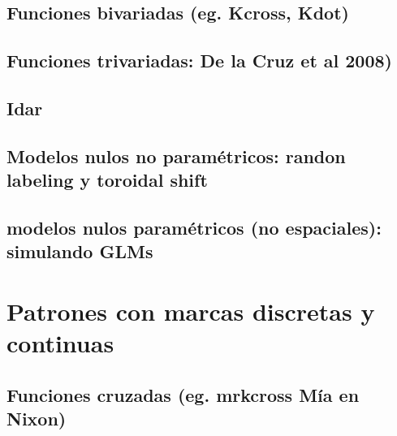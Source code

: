 \documentclass[
  letterpaper,
  DIV=11,
  numbers=noendperiod]{scrreprt}
\begin{document}
\hypertarget{funciones-bivariadas-eg.-kcross-kdot}{%
\section{Funciones bivariadas (eg. Kcross,
Kdot)}\label{funciones-bivariadas-eg.-kcross-kdot}}

\hypertarget{funciones-trivariadas-de-la-cruz-et-al-2008}{%
\section{Funciones trivariadas: De la Cruz et al
2008)}\label{funciones-trivariadas-de-la-cruz-et-al-2008}}

\hypertarget{idar}{%
\section{Idar}\label{idar}}

\hypertarget{modelos-nulos-no-paramuxe9tricos-randon-labeling-y-toroidal-shift-1}{%
\section{Modelos nulos no paramétricos: randon labeling y toroidal
shift}\label{modelos-nulos-no-paramuxe9tricos-randon-labeling-y-toroidal-shift-1}}

\hypertarget{modelos-nulos-paramuxe9tricos-no-espaciales-simulando-glms-1}{%
\section{modelos nulos paramétricos (no espaciales): simulando
GLMs}\label{modelos-nulos-paramuxe9tricos-no-espaciales-simulando-glms-1}}


\hypertarget{patrones-con-marcas-discretas-y-continuas}{%
\chapter{Patrones con marcas discretas y
continuas}\label{patrones-con-marcas-discretas-y-continuas}}

\hypertarget{funciones-cruzadas-eg.-mrkcross-muxeda-en-nixon}{%
\section{Funciones cruzadas (eg. mrkcross Mía en
Nixon)}\label{funciones-cruzadas-eg.-mrkcross-muxeda-en-nixon}}
\end{document}
